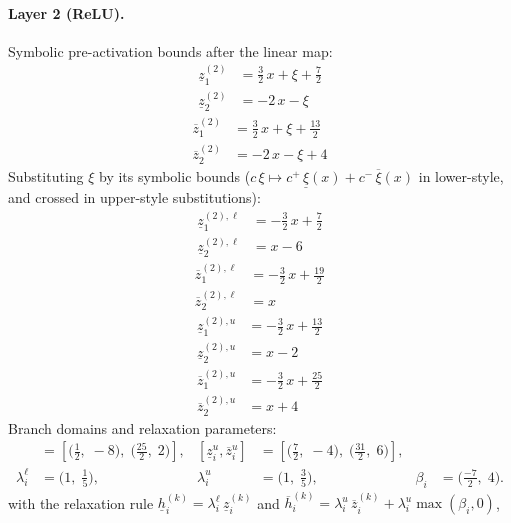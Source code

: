 \documentclass[11pt]{article}
\begin{document}
\paragraph{Layer 2 (ReLU).}
Symbolic pre-activation bounds after the linear map:
\begin{align*}
\underline{z}^{(2)}_{1} &= \frac{3}{2}\,x + \xi + \frac{7}{2} \\
\underline{z}^{(2)}_{2} &= -2\,x - \xi
\end{align*}
\begin{align*}
\overline{z}^{(2)}_{1} &= \frac{3}{2}\,x + \xi + \frac{13}{2} \\
\overline{z}^{(2)}_{2} &= -2\,x - \xi + 4
\end{align*}
Substituting $\xi$ by its symbolic bounds ($c\,\xi \mapsto c^{+}\,\underline{\xi}(x) + c^{-}\,\overline{\xi}(x)$ in lower-style, and crossed in upper-style substitutions):
\begin{align*}
\underline{z}^{(2),\ell}_{1} &= -\frac{3}{2}\,x + \frac{7}{2} \\
\underline{z}^{(2),\ell}_{2} &= x - 6
\end{align*}
\begin{align*}
\overline{z}^{(2),\ell}_{1} &= -\frac{3}{2}\,x + \frac{19}{2} \\
\overline{z}^{(2),\ell}_{2} &= x
\end{align*}
\begin{align*}
\underline{z}^{(2),u}_{1} &= -\frac{3}{2}\,x + \frac{13}{2} \\
\underline{z}^{(2),u}_{2} &= x - 2
\end{align*}
\begin{align*}
\overline{z}^{(2),u}_{1} &= -\frac{3}{2}\,x + \frac{25}{2} \\
\overline{z}^{(2),u}_{2} &= x + 4
\end{align*}
Branch domains and relaxation parameters:
\begin{align*}
[\underline{z}^{\ell}_i, \overline{z}^{\ell}_i] &= [\bigl(\frac{1}{2},\; -8\bigr),\; \bigl(\frac{25}{2},\; 2\bigr)], & [\underline{z}^{u}_i, \overline{z}^{u}_i] &= [\bigl(\frac{7}{2},\; -4\bigr),\; \bigl(\frac{31}{2},\; 6\bigr)], \\
\lambda^{\ell}_i &= \bigl(1,\; \frac{1}{5}\bigr), & \lambda^{u}_i &= \bigl(1,\; \frac{3}{5}\bigr), & \beta_i &= \bigl(\frac{-7}{2},\; 4\bigr).
\end{align*}
with the relaxation rule
$\underline{h}^{(k)}_i = \lambda^{\ell}_i\, \underline{z}^{(k)}_i$ and
$\overline{h}^{(k)}_i = \lambda^{u}_i\, \overline{z}^{(k)}_i + \lambda^{u}_i \max(\beta_i, 0)$,
\end{document}
